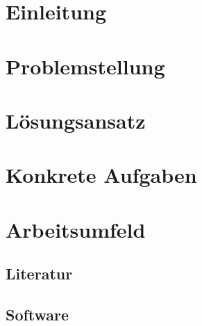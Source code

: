 \tableofcontents
\newpage

\section{Einleitung}
\label{sec:einleitung}

\section{Problemstellung}
\label{sec:problemstellung}

\section{Lösungsansatz}
\label{sec:loesungsansatz}

\section{Konkrete Aufgaben}
\label{sec:konkrete_aufgaben}

\section{Arbeitsumfeld}
\label{sec:arbeitsumfeld}

  \subsection{Literatur}
  \label{ssec:literatur}
  \nocite{Johnson:1997:FRA:262793.262799}
  

  \subsection{Software}
  \label{ssec:software}

